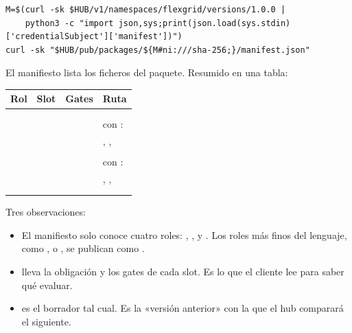 \begin{lstlisting}[style=sh]
M=$(curl -sk $HUB/v1/namespaces/flexgrid/versions/1.0.0 |
    python3 -c "import json,sys;print(json.load(sys.stdin)['credentialSubject']['manifest'])")
curl -sk "$HUB/pub/packages/${M#ni:///sha-256;}/manifest.json"
\end{lstlisting}

El manifiesto lista los ficheros del paquete. Resumido en una tabla:

\begin{longtable}{@{}L{2.5cm}L{1.1cm}L{2.9cm}L{8.3cm}@{}}
\toprule
\textbf{Rol} & \textbf{Slot} & \textbf{Gates} & \textbf{Ruta} \\
\midrule
\endhead
{} &  &  &  \\
 &  &  &  \\
 &  & &  \newline con :  \\
 &  & & , ,  \\
 &  &  &  \\
 &  & &  \newline con :  \\
 & & & , ,  \\
 & & &  \\
 & & &  \\
\bottomrule
\end{longtable}

Tres observaciones:

\begin{itemize}[leftmargin=*, itemsep=2pt]
  \item El manifiesto solo conoce cuatro roles: , ,  y .
        Los roles más finos del lenguaje, como ,  o , se publican como
        .
  \item {} lleva la obligación y los gates de cada slot. Es lo que el cliente lee para
        saber qué evaluar.
  \item {} es el borrador tal cual. Es la «versión anterior» con la que el hub comparará
        el siguiente.
\end{itemize}

